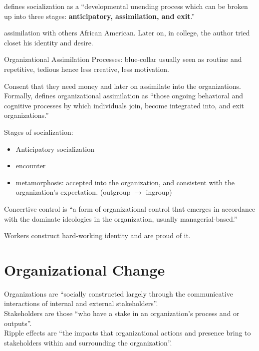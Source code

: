 \documentclass[
]{book}
\providecommand{\tightlist}{%
  \setlength{\itemsep}{0pt}\setlength{\parskip}{0pt}}
\begin{document}
\citep{ferguson2017}

\citep{jablin_1987} defines socialization as a ``developmental unending process which can be broken up into three stages: \textbf{anticipatory, assimilation, and exit}.''

assimilation with others African American.
Later on, in college, the author tried closet his identity and desire.

\citep{Gibson_2000}

Organizational Assimilation Processes: blue-collar usually seen as routine and repetitive, tedious hence less creative, less motivation.

Consent that they need money and later on assimilate into the organizations.
Formally, \citep[pp.712]{jablin_1987} defines organizational assimilation as ``those ongoing behavioral and cognitive processes by which individuals join, become integrated into, and exit organizations.''

Stages of socialization:

\begin{itemize}
\tightlist
\item
  Anticipatory socialization
\item
  encounter
\item
  metamorphosis: accepted into the organization, and consistent with the organization's expectation. (outgroup \(\to\) ingroup)
\end{itemize}

Concertive control is ``a form of organizational control that emerges in accordance with the dominate ideologies in the organization, usually managerial-based.''

Workers construct hard-working identity and are proud of it.

\hypertarget{organizational-change}{%
\chapter{Organizational Change}\label{organizational-change}}

\citep{Lewis_2019} Organizations are ``socially constructed largely through the communicative interactions of internal and external stakeholders''.\\
Stakeholders are those ``who have a stake in an organization's process and or outputs''.\\
Ripple effects are ``the impacts that organizational actions and presence bring to stakeholders within and surrounding the organization''.
\end{document}
